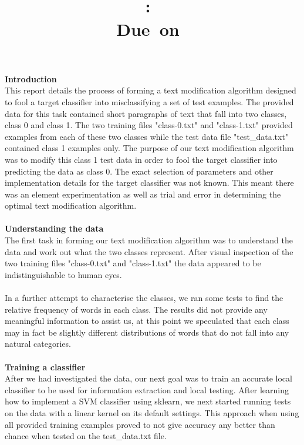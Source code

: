 \documentclass{article}
\title{
\vspace{3.5in}
\textmd{\textbf{\hmwkSubject}}\\
\textmd{\textbf{\hmwkClass:\ \hmwkTitle}}\\
\normalsize\vspace{0.1in}\small{Due\ on\ \hmwkDueDate}\\
\vspace{3.5in}
}
\author{\textbf{\hmwkAuthorName}}
\date{} %
\begin{document}
\maketitle

\textbf{\large Introduction} \\
This report details the process of forming a text modification algorithm designed to fool a target classifier into misclassifying a set of test examples. The provided data for this task contained short paragraphs of text that fall into two classes, class 0 and class 1. The two training files "class-0.txt" and "class-1.txt" provided examples from each of these two classes while the test data file "test\_data.txt" contained class 1 examples only. The purpose of our text modification algorithm was to modify this class 1 test data in order to fool the target classifier into predicting the data as class 0. The exact selection of parameters and other implementation details for the target classifier was not known. This meant there was an element experimentation as well as trial and error in determining the optimal text modification algorithm. \\ \\
\textbf{\large Understanding the data} \\
The first task in forming our text modification algorithm was to understand the data and work out what the two classes represent. After visual inspection of the two training files "class-0.txt" and "class-1.txt" the data appeared to be indistinguishable to human eyes. \\ \\
In a further attempt to characterise the classes, we ran some tests to find the relative frequency of words in each class. The results did not provide any meaningful information to assist us, at this point we speculated that each class may in fact be slightly different distributions of words that do not fall into any natural categories. \\ \\
\textbf{\large Training a classifier} \\
After we had investigated the data, our next goal was to train an accurate local classifier to be used for information extraction and local testing. After learning how to implement a SVM classifier using sklearn, we next started running tests on the data with a linear kernel on its default settings. This approach when using all provided training examples proved to not give accuracy any better than chance when tested on the test\_data.txt file. \\ \\
\end{document}
